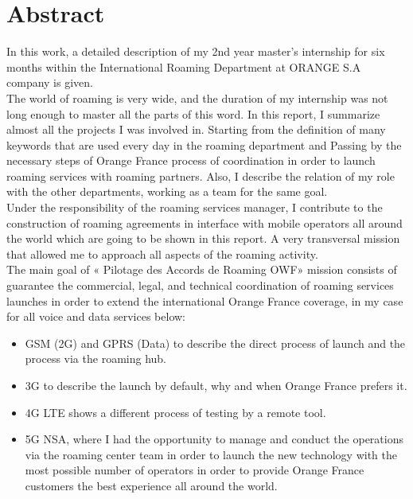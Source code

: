 \documentclass[12pt,a4paper,onecolumn,openright,oneside]{report}
\begin{document}
	\afterpage{\blankpage}

	\chapter*{\huge Abstract}
		
	In this work, a detailed description of my 2nd year master’s internship for six months within the International Roaming Department at ORANGE S.A company is given.\\

	The world of roaming is very wide, and the duration of my internship was not long enough to master all the parts of this word. In this report, I summarize almost all the projects I was involved in. Starting from the definition of many keywords that are used every day in the roaming department and Passing by the necessary steps of Orange France process of coordination in order to launch roaming services with roaming partners. Also, I describe the relation of my role with the other departments, working as a team for the same goal.
	\\
		
	Under the responsibility of the roaming services manager, I contribute to the construction of roaming agreements in interface with mobile operators all around the world which are going to be shown in this report. A very transversal mission that allowed me to approach all aspects of the roaming activity.
	\\
		
	The main goal of « Pilotage des Accords de Roaming \acs{OWF}» mission consists of guarantee the commercial, legal, and technical coordination of roaming services launches in order to extend the international Orange France coverage, in my case for all voice and data services below:
	\begin{itemize}[label={\textbullet}]
		\item \acs{GSM} (\acs{2G}) and \acs{GPRS} (Data) to describe the direct process of launch and the process via the roaming hub.
		\item \acs{3G} to describe the launch by default, why and when Orange France prefers it. 
		\item \acs{4G} \acs{LTE} shows a different process of testing by a remote tool.
		\item \acs{5G} \acs{NSA}, where I had the opportunity to manage and conduct the operations via the roaming center team in order to launch the new technology with the most possible number of operators in order to provide Orange France customers the best experience all around the world.
	\end{itemize}
\end{document}
